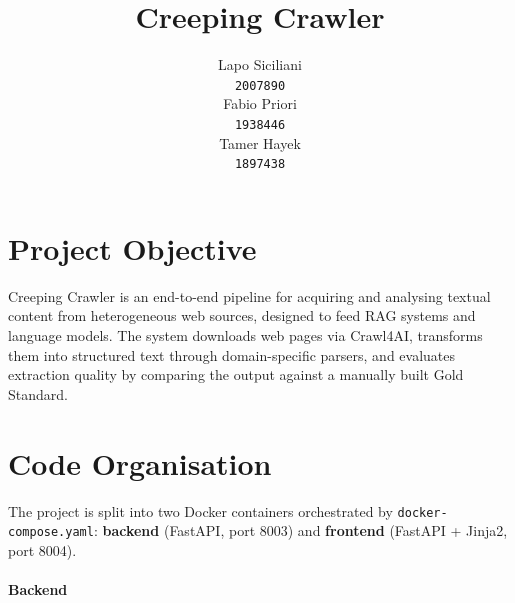 \documentclass[11pt]{article}
\title{Creeping Crawler}
\author{Lapo Siciliani \\
  \texttt{2007890} \\\And
  Fabio Priori \\
  \texttt{1938446} \\\And
  Tamer Hayek \\
  \texttt{1897438} \\}
\begin{document}
\maketitle


\section{Project Objective}

Creeping Crawler is an end-to-end pipeline for acquiring and analysing textual content from heterogeneous web sources, designed to feed RAG systems and language models. The system downloads web pages via Crawl4AI, transforms them into structured text through domain-specific parsers, and evaluates extraction quality by comparing the output against a manually built Gold Standard.


\section{Code Organisation}

The project is split into two Docker containers orchestrated by \texttt{docker-compose.yaml}: \textbf{backend} (FastAPI, port 8003) and \textbf{frontend} (FastAPI + Jinja2, port 8004).

\paragraph{Backend}
\end{document}
